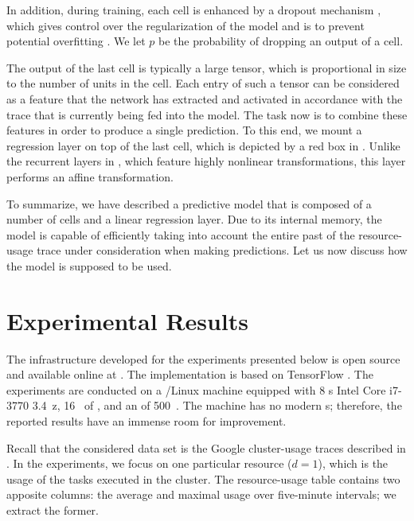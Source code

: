 In addition, during training, each cell is enhanced by a dropout mechanism
\cite{zaremba2014}, which gives control over the regularization of the model and
is to prevent potential overfitting \cite{hastie2013}. We let $p$ be the
probability of dropping an output of a cell.

The output of the last cell is typically a large tensor, which is proportional
in size to the number of units in the cell. Each entry of such a tensor can be
considered as a feature that the network has extracted and activated in
accordance with the trace that is currently being fed into the model. The task
now is to combine these features in order to produce a single prediction. To
this end, we mount a regression layer on top of the last cell, which is depicted
by a red box in . Unlike the recurrent layers in ,
which feature highly nonlinear transformations, this layer performs an affine
transformation.

To summarize, we have described a predictive model that is composed of a number
of  cells and a linear regression layer. Due to its internal memory,
the model is capable of efficiently taking into account the entire past of the
resource-usage trace under consideration when making predictions. Let us now
discuss how the model is supposed to be used.

\section{Experimental Results}

The infrastructure developed for the experiments presented below is open source
and available online at \cite{eslab2017b}. The implementation is based on
TensorFlow \cite{abadi2015}. The experiments are conducted on a /Linux
machine equipped with 8 s Intel Core i7-3770 3.4~z, 16~ of
, and an  of 500~. The machine has no modern s;
therefore, the reported results have an immense room for improvement.


Recall that the considered data set is the Google cluster-usage traces
\cite{reiss2011} described in . In the experiments, we focus on one
particular resource ($d = 1$), which is the  usage of the tasks executed
in the cluster. The resource-usage table contains two apposite columns: the
average and maximal  usage over five-minute intervals; we extract the
former.

